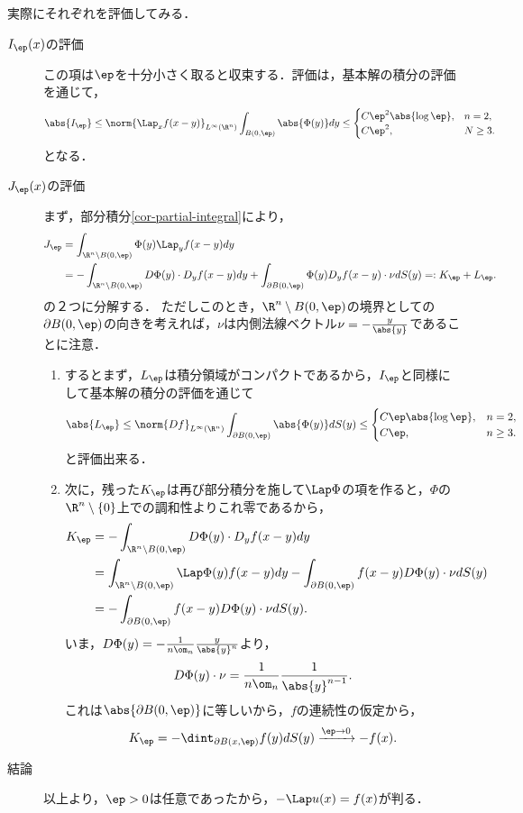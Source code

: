 \documentclass[uplatex,dvipdfmx]{jsreport}
\begin{document}
\begin{Proof}
\begin{enumerate}
        実際にそれぞれを評価してみる．
        \begin{description}
            \item[$I_\ep(x)$の評価] 
            この項は$\ep$を十分小さく取ると収束する．評価は，基本解の積分の評価を通じて，
            \[\abs{I_\ep}\le\norm{\Lap_xf(x-y)}_{L^\infty(\R^n)}\int_{B(0,\ep)}\abs{\Phi(y)}dy\le\begin{cases}
                C\ep^2\abs{\log\ep},&n=2,\\
                C\ep^2,&N\ge3.
            \end{cases}\]
            となる．
            \item[$J_\ep(x)$の評価] 
            まず，部分積分\ref{cor-partial-integral}により，
            \begin{align*}
                J_\ep&=\int_{\R^n\setminus B(0,\ep)}\Phi(y)\Lap_yf(x-y)dy\\
                &=-\int_{\R^n\setminus B(0,\ep)}D\Phi(y)\cdot D_yf(x-y)dy+\int_{\partial B(0,\ep)}\Phi(y)D_yf(x-y)\cdot\nu dS(y)=:K_\ep+L_\ep.
            \end{align*}
            の２つに分解する．
            ただしこのとき，$\R^n\setminus B(0,\ep)$の境界としての$\partial B(0,\ep)$の向きを考えれば，$\nu$は内側法線ベクトル$\nu=-\frac{y}{\abs{y}}$であることに注意．
            \begin{enumerate}
                \item するとまず，$L_\ep$は積分領域がコンパクトであるから，$I_\ep$と同様にして基本解の積分の評価を通じて
                \[\abs{L_\ep}\le\norm{Df}_{L^\infty(\R^n)}\int_{\partial B(0,\ep)}\abs{\Phi(y)}dS(y)\le\begin{cases}
                    C\ep\abs{\log\ep},&n=2,\\
                    C\ep,&n\ge3.
                \end{cases}\]
                と評価出来る．
                \item 次に，残った$K_\ep$は再び部分積分を施して$\Lap\Phi$の項を作ると，$\Phi$の$\R^n\setminus\{0\}$上での調和性よりこれ零であるから，
                \begin{align*}
                    K_\ep&=-\int_{\R^n\setminus B(0,\ep)}D\Phi(y)\cdot D_yf(x-y)dy\\
                    &=\int_{\R^n\setminus B(0,\ep)}\Lap\Phi(y)f(x-y)dy-\int_{\partial B(0,\ep)}f(x-y)D\Phi(y)\cdot\nu dS(y)\\
                    &=-\int_{\partial B(0,\ep)}f(x-y)D\Phi(y)\cdot\nu dS(y).
                \end{align*}
                いま，$D\Phi(y)=-\frac{1}{n\om_n}\frac{y}{\abs{y}^n}$より，
                \[D\Phi(y)\cdot\nu=\frac{1}{n\om_n}\frac{1}{\abs{y}^{n-1}}.\]
                これは$\abs{\partial B(0,\ep)}$に等しいから，$f$の連続性の仮定から，
                \[K_\ep=-\dint_{\partial B(x,\ep)}f(y)dS(y)\xrightarrow{\ep\to0}-f(x).\]
            \end{enumerate}
            \item[結論] 以上より，$\ep>0$は任意であったから，$-\Lap u(x)=f(x)$が判る．
        \end{description}
    \end{enumerate}
\end{Proof}
\end{document}
